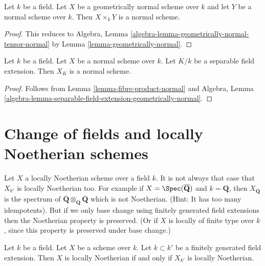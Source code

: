 \begin{lemma}
\label{lemma-fibre-product-normal}
Let $k$ be a field. Let $X$ be a geometrically normal scheme over $k$
and let $Y$ be a normal scheme over $k$. Then $X \times_k Y$ is a normal
scheme.
\end{lemma}

\begin{proof}
This reduces to
Algebra, Lemma \ref{algebra-lemma-geometrically-normal-tensor-normal}
by
Lemma \ref{lemma-geometrically-normal}.
\end{proof}

\begin{lemma}
\label{lemma-base-change-normal-by-separable}
Let $k$ be a field. Let $X$ be a normal scheme over $k$. Let $K/k$
be a separable field extension. Then $X_K$ is a normal scheme.
\end{lemma}

\begin{proof}
Follows from Lemma \ref{lemma-fibre-product-normal} and
Algebra, Lemma
\ref{algebra-lemma-separable-field-extension-geometrically-normal}.
\end{proof}









\section{Change of fields and locally Noetherian schemes}
\label{section-locally-Noetherian}

\noindent
Let $X$ a locally Noetherian scheme over a field $k$.
It is not always that case that $X_{k'}$ is locally Noetherian too.
For example if $X = \Spec(\overline{\mathbf{Q}})$ and
$k = \mathbf{Q}$, then $X_{\overline{\mathbf{Q}}}$ is the spectrum
of $\overline{\mathbf{Q}} \otimes_{\mathbf{Q}} \overline{\mathbf{Q}}$
which is not Noetherian. (Hint: It has too many idempotents).
But if we only base change using finitely generated field extensions
then the Noetherian property is preserved. (Or if $X$ is locally of finite
type over $k$, since this property is preserved under base change.)

\begin{lemma}
\label{lemma-locally-Noetherian-base-change}
Let $k$ be a field.
Let $X$ be a scheme over $k$.
Let $k \subset k'$ be a finitely generated field extension.
Then $X$ is locally Noetherian if and only if $X_{k'}$ is locally
Noetherian.
\end{lemma}


